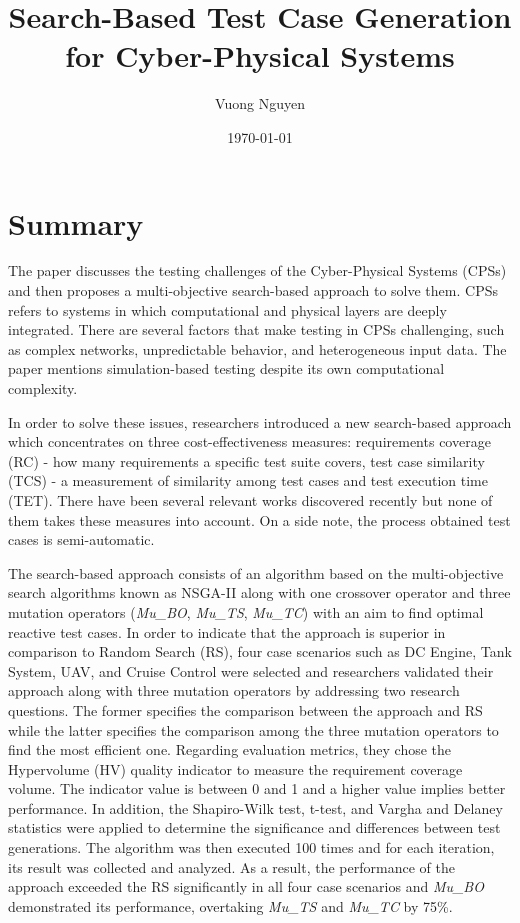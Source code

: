 \documentclass[10pt,a4paper]{report}
\title{Search-Based Test Case Generation for Cyber-Physical Systems}
\author{Vuong Nguyen}
\date{\today}
\begin{document}
\begin{center}
\textbf{\thetitle}
\end{center}

\section{Summary}
The paper discusses the testing challenges of the Cyber-Physical Systems (CPSs) and then proposes a multi-objective search-based approach to solve them. CPSs refers to systems in which computational and physical layers are deeply integrated. There are several factors that make testing in CPSs challenging, such as complex networks, unpredictable behavior, and heterogeneous input data. The paper mentions simulation-based testing despite its own computational complexity.

In order to solve these issues, researchers introduced a new search-based approach which concentrates on three cost-eﬀectiveness measures: requirements coverage (RC) - how many requirements a speciﬁc test suite covers, test case similarity (TCS) - a measurement of similarity among test cases and test execution time (TET). There have been several relevant works discovered recently but none of them takes these measures into account. On a side note, the process obtained test cases is semi-automatic. 

The search-based approach consists of an algorithm based on the multi-objective search algorithms known as NSGA-II along with one crossover operator and three mutation operators (\emph{Mu\_BO}, \emph{Mu\_TS}, \emph{Mu\_TC}) with an aim to ﬁnd optimal reactive test cases. In order to indicate that the approach is superior in comparison to Random Search (RS), four case scenarios such as DC Engine, Tank System, UAV, and Cruise Control were selected and researchers validated their approach along with three mutation operators by addressing two research questions. The former speciﬁes the comparison between the approach and RS while the latter speciﬁes the comparison among the three mutation operators to ﬁnd the most efficient one. Regarding evaluation metrics, they chose the Hypervolume (HV) quality indicator to measure the requirement coverage volume. The indicator value is between 0 and 1 and a higher value implies better performance. In addition, the Shapiro-Wilk test, t-test, and Vargha and Delaney statistics were applied to determine the signiﬁcance and diﬀerences between test generations. The algorithm was then executed 100 times and for each iteration, its result was collected and analyzed. As a result, the performance of the approach exceeded the RS signiﬁcantly in all four case scenarios and \emph{Mu\_BO} demonstrated its performance, overtaking \emph{Mu\_TS} and \emph{Mu\_TC} by 75\%.\par
\end{document}
